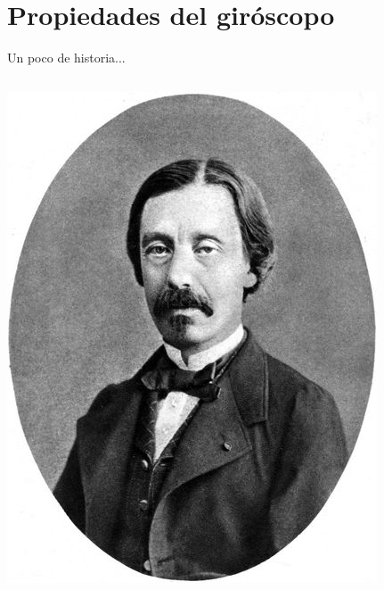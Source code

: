 
\section{Propiedades del gir\'oscopo}
\label{sec:propiedades.giroscopo}

\begin{frame}{Un poco de historia...}
  
  \begin{columns}
    \begin{column}{0.3\textwidth}
      \includegraphics[width=0.7\linewidth]{05.instrumentos.giroscopicos.imagenes/05.01.movimientos/foucault.jpg}


\end{column}
\end{columns}
\end{frame}
